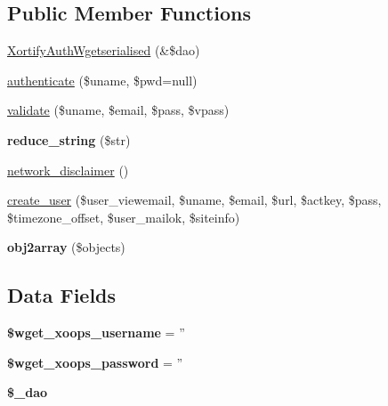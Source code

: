 \subsection*{Public Member Functions}
\begin{DoxyCompactItemize}
\item 
\hyperlink{class_xortify_auth_wgetserialised_a105dc6259614484bc637fdf1a5aa3832}{Xortify\-Auth\-Wgetserialised} (\&\$dao)
\item 
\hyperlink{class_xortify_auth_wgetserialised_a00678ba307326b734e6c679f28bea315}{authenticate} (\$uname, \$pwd=null)
\item 
\hyperlink{class_xortify_auth_wgetserialised_a91121a1b702dfd20fb65a027c8ed26ec}{validate} (\$uname, \$email, \$pass, \$vpass)
\item 
\hypertarget{class_xortify_auth_wgetserialised_ae463a3baa44e95fa5b5151ab2334df1c}{{\bfseries reduce\-\_\-string} (\$str)}\label{class_xortify_auth_wgetserialised_ae463a3baa44e95fa5b5151ab2334df1c}

\item 
\hyperlink{class_xortify_auth_wgetserialised_a1874c27b6f81a3f2ff9015405ad0f8bc}{network\-\_\-disclaimer} ()
\item 
\hyperlink{class_xortify_auth_wgetserialised_ac72efc5ad313a592cf6706876f56f7ec}{create\-\_\-user} (\$user\-\_\-viewemail, \$uname, \$email, \$url, \$actkey, \$pass, \$timezone\-\_\-offset, \$user\-\_\-mailok, \$siteinfo)
\item 
\hypertarget{class_xortify_auth_wgetserialised_aabc52e4f78557f0e0b360a8aaba6e11d}{{\bfseries obj2array} (\$objects)}\label{class_xortify_auth_wgetserialised_aabc52e4f78557f0e0b360a8aaba6e11d}

\end{DoxyCompactItemize}
\subsection*{Data Fields}
\begin{DoxyCompactItemize}
\item 
\hypertarget{class_xortify_auth_wgetserialised_a237f5dcc3c161c5b1909327a90b56618}{{\bfseries \$wget\-\_\-xoops\-\_\-username} = ''}\label{class_xortify_auth_wgetserialised_a237f5dcc3c161c5b1909327a90b56618}

\item 
\hypertarget{class_xortify_auth_wgetserialised_ab9145a618042e8282ecb90d5f634311f}{{\bfseries \$wget\-\_\-xoops\-\_\-password} = ''}\label{class_xortify_auth_wgetserialised_ab9145a618042e8282ecb90d5f634311f}

\item 
\hypertarget{class_xortify_auth_wgetserialised_a12a029c610f699b4b25e79a1f64a3485}{{\bfseries \$\-\_\-dao}}\label{class_xortify_auth_wgetserialised_a12a029c610f699b4b25e79a1f64a3485}

\end{DoxyCompactItemize}


